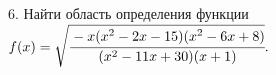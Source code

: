 6. Найти область определения функции $f(x)=\sqrt{\cfrac{-x(x^2-2x-15)(x^2-6x+8)}{(x^2-11x+30)(x+1)}}.$\\
